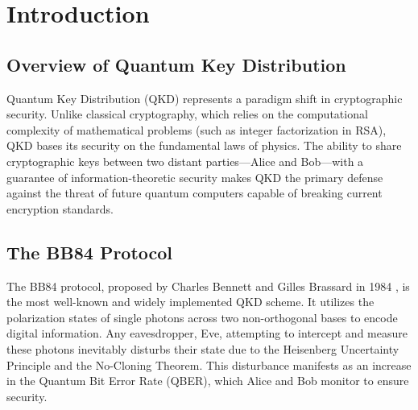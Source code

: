 \documentclass[journal,onecolumn,12pt,draftclsnofoot]{IEEEtran}
\begin{document}
\newpage

\tableofcontents
\newpage

\listoffigures
\listoftables
\newpage


\section{Introduction}

\subsection{Overview of Quantum Key Distribution}
Quantum Key Distribution (QKD) represents a paradigm shift in cryptographic security. Unlike classical cryptography, which relies on the computational complexity of mathematical problems (such as integer factorization in RSA), QKD bases its security on the fundamental laws of physics. The ability to share cryptographic keys between two distant parties—Alice and Bob—with a guarantee of information-theoretic security makes QKD the primary defense against the threat of future quantum computers capable of breaking current encryption standards.

\subsection{The BB84 Protocol}
The BB84 protocol, proposed by Charles Bennett and Gilles Brassard in 1984 \cite{bb84}, is the most well-known and widely implemented QKD scheme. It utilizes the polarization states of single photons across two non-orthogonal bases to encode digital information. Any eavesdropper, Eve, attempting to intercept and measure these photons inevitably disturbs their state due to the Heisenberg Uncertainty Principle and the No-Cloning Theorem. This disturbance manifests as an increase in the Quantum Bit Error Rate (QBER), which Alice and Bob monitor to ensure security.
\end{document}
